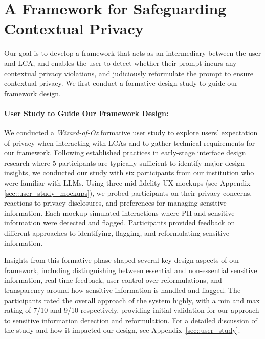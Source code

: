 \vspace{-5pt}
\section{A Framework for Safeguarding Contextual Privacy}
\label{sec:framework}
\vspace{-5pt}
Our goal is to develop a framework that acts as an intermediary between the user and LCA, and enables the user to detect whether their prompt incurs any contextual privacy violations, and judiciously reformulate the prompt to ensure contextual privacy. We first conduct a formative design study to guide our framework design.

\paragraph{User Study to Guide Our Framework Design:} 
We conducted a \textit{Wizard-of-Oz} formative user study to explore users' expectation of privacy when interacting with LCAs and to gather technical requirements for our framework.
Following established practices in early-stage interface design research \citep{ nielsen2000fiveusers, budiu2021fiveparticipants, nielsen1993mathematical}  where 5 participants are typically sufficient to identify major design insights, we conducted our study with six participants from our institution who were familiar with LLMs.
Using three mid-fidelity UX mockups (see Appendix \ref{sec::user_study_mockups}), we probed participants on their privacy concerns, reactions to privacy disclosures, and preferences for managing sensitive information. Each mockup simulated interactions where PII and sensitive information were detected and flagged. Participants provided feedback on different approaches to identifying, flagging, and reformulating sensitive information. 

Insights from this formative phase shaped several key design aspects of our framework, including distinguishing between essential and non-essential sensitive information, real-time feedback, user control over reformulations, and transparency around how sensitive information is handled and flagged. The participants rated the overall approach of the system highly, with a min and max rating of 7/10 and 9/10 respectively, providing initial validation for our approach to sensitive information detection and reformulation. For a detailed discussion of the study and how it impacted our design, see Appendix~\ref{sec::user_study}.
 
